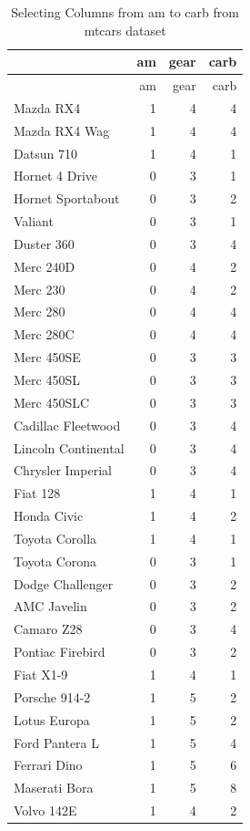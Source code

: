 \documentclass[
  letterpaper,
  paper =a4,
  twoside,
  openright,
  headsepline,
  footsepline,
  listof = totocnumbered,
  chapterprefix = true,
  firstiscover]{scrbook}
\begin{document}
\begin{longtable}[]{@{}lrrr@{}}
\caption{Selecting Columns from am to carb from mtcars
dataset}\tabularnewline
\toprule\noalign{}
& am & gear & carb \\
\midrule\noalign{}
\endfirsthead
\toprule\noalign{}
& am & gear & carb \\
\midrule\noalign{}
\endhead
\bottomrule\noalign{}
\endlastfoot
Mazda RX4 & 1 & 4 & 4 \\
Mazda RX4 Wag & 1 & 4 & 4 \\
Datsun 710 & 1 & 4 & 1 \\
Hornet 4 Drive & 0 & 3 & 1 \\
Hornet Sportabout & 0 & 3 & 2 \\
Valiant & 0 & 3 & 1 \\
Duster 360 & 0 & 3 & 4 \\
Merc 240D & 0 & 4 & 2 \\
Merc 230 & 0 & 4 & 2 \\
Merc 280 & 0 & 4 & 4 \\
Merc 280C & 0 & 4 & 4 \\
Merc 450SE & 0 & 3 & 3 \\
Merc 450SL & 0 & 3 & 3 \\
Merc 450SLC & 0 & 3 & 3 \\
Cadillac Fleetwood & 0 & 3 & 4 \\
Lincoln Continental & 0 & 3 & 4 \\
Chrysler Imperial & 0 & 3 & 4 \\
Fiat 128 & 1 & 4 & 1 \\
Honda Civic & 1 & 4 & 2 \\
Toyota Corolla & 1 & 4 & 1 \\
Toyota Corona & 0 & 3 & 1 \\
Dodge Challenger & 0 & 3 & 2 \\
AMC Javelin & 0 & 3 & 2 \\
Camaro Z28 & 0 & 3 & 4 \\
Pontiac Firebird & 0 & 3 & 2 \\
Fiat X1-9 & 1 & 4 & 1 \\
Porsche 914-2 & 1 & 5 & 2 \\
Lotus Europa & 1 & 5 & 2 \\
Ford Pantera L & 1 & 5 & 4 \\
Ferrari Dino & 1 & 5 & 6 \\
Maserati Bora & 1 & 5 & 8 \\
Volvo 142E & 1 & 4 & 2 \\
\end{longtable}
\end{document}
